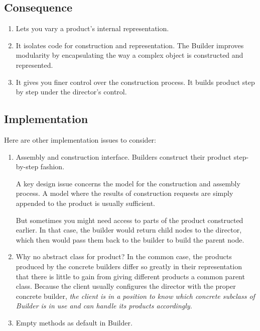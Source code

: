 \documentclass[11pt, a4paper]{book}
\begin{document}
\subsection{Consequence}
\begin{enumerate}
    \item Lets you vary a product's internal representation.
    \item It isolates code for construction and representation. The Builder improves
    modularity by encapsulating the way a complex object is constructed and
    represented.
    \item It gives you finer control over the construction process. It builds
    product step by step under the director's control.
\end{enumerate}
\subsection{Implementation}
Here are other implementation issues to consider:
\begin{enumerate}
    \item Assembly and construction interface. Builders construct their product
    step-by-step fashion.

    A key design issue concerns the model for the construction and assembly
    process.
    A model where the results of construction requests are simply appended to the
    product is usually sufficient. 

    But sometimes you might need access to parts of the product constructed
    earlier. In that case, the builder would return child nodes to the director,
    which then would pass them back to the builder to build the parent node.

    \item Why no abstract class for product? In the common case, the products
    produced by the concrete builders differ so greatly in their representation
    that there is little to gain from giving different products a common parent
    class. Because the client usually configures the director with the proper
    concrete builder, \emph{the client is in a position to know which concrete
    subclass of Builder is in use and can handle its products accordingly.}
    \item Empty methods as default in Builder.
\end{enumerate}
\end{document}
